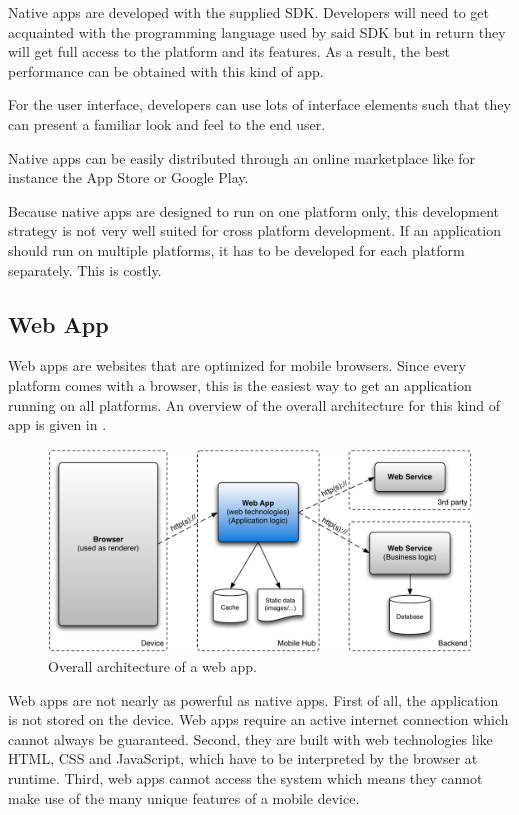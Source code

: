 Native apps are developed with the supplied SDK. Developers will need to get acquainted with the programming language used by said SDK but in return they will get full access to the platform and its features. As a result, the best performance can be obtained with this kind of app.

For the user interface, developers can use lots of interface elements such that they can present a familiar look and feel to the end user. 

Native apps can be easily distributed through an online marketplace like for instance the App Store or Google Play. 

Because native apps are designed to run on one platform only, this development strategy is not very well suited for cross platform development. If an application should run on multiple platforms, it has to be developed for each platform separately. This is costly.

\subsection{Web App}

Web apps are websites that are optimized for mobile browsers. Since every platform comes with a browser, this is the easiest way to get an application running on all platforms. An overview of the overall architecture for this kind of app is given in .

\begin{figure}[h!]
    \begin{center}
        \includegraphics[width=\textwidth]{figs/web.pdf}
        \caption{
            Overall architecture of a web app.
        }
        \label{fig:web}
    \end{center}
\end{figure}

Web apps are not nearly as powerful as native apps. First of all, the application is not stored on the device. Web apps require an active internet connection which cannot always be guaranteed. Second, they are built with web technologies like HTML, CSS and JavaScript, which have to be interpreted by the browser at runtime. Third, web apps cannot access the system which means they cannot make use of the many unique features of a mobile device. 

